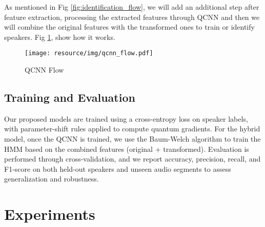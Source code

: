 \documentclass[conference]{IEEEtran}
\begin{document}
As mentioned in Fig \ref{fig:identification_flow}, we will add an additional step after feature extraction, processing the extracted features through QCNN and then we will combine the original features with the transformed ones to train or identify speakers. Fig \ref{fig:qcnn_flow}, show how it works.

\begin{figure}[H]
    \centering
    \begin{minipage}{0.5\textwidth}
        \centering
        \texttt{[image: resource/img/qcnn\_flow.pdf]}
        \caption{QCNN Flow}
        \label{fig:qcnn_flow}
    \end{minipage}

\end{figure}
\subsection{Training and Evaluation}

Our proposed models are trained using a cross-entropy loss on speaker labels, with parameter-shift rules applied to compute quantum gradients. For the hybrid model, once the QCNN is trained, we use the Baum-Welch algorithm to train the HMM based on the combined features (original + transformed). Evaluation is performed through cross-validation, and we report accuracy, precision, recall, and F1-score on both held-out speakers and unseen audio segments to assess generalization and robustness.


\section{Experiments}
\end{document}
